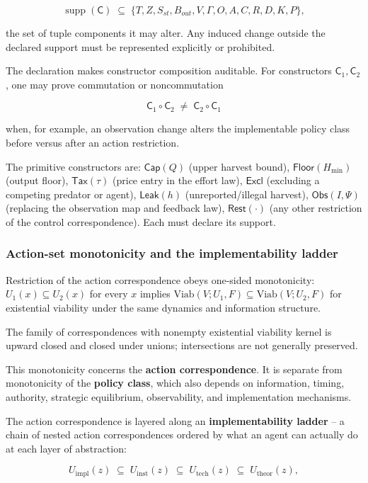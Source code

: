 \documentclass[preprint,11pt,authoryear]{elsarticle}
\theoremstyle{remark}
\begin{document}
\[\operatorname{supp}(\mathsf{C}) \;\subseteq\; \{ T, Z, S_{st}, B_{out}, V, \Gamma, O, A, C, R, D, K, P \},\]

the set of tuple components it may alter. Any induced change outside the declared support must be represented explicitly or prohibited.

The declaration makes constructor composition auditable. For constructors $\mathsf{C}_1, \mathsf{C}_2$, one may prove commutation or noncommutation

\[\mathsf{C}_1 \circ \mathsf{C}_2 \;\neq\; \mathsf{C}_2 \circ \mathsf{C}_1\]

when, for example, an observation change alters the implementable policy class before versus after an action restriction.

The primitive constructors are: $\mathsf{Cap}(Q)$ (upper harvest bound), $\mathsf{Floor}(H_{\min})$ (output floor), $\mathsf{Tax}(\tau)$ (price entry in the effort law), $\mathsf{Excl}$ (excluding a competing predator or agent), $\mathsf{Leak}(h)$ (unreported/illegal harvest), $\mathsf{Obs}(I, \Psi)$ (replacing the observation map and feedback law), $\mathsf{Rest}(\cdot)$ (any other restriction of the control correspondence). Each must declare its support.

\subsubsection{Action-set monotonicity and the implementability ladder}

Restriction of the action correspondence obeys one-sided monotonicity: $U_1(x) \subseteq U_2(x)$ for every $x$ implies $\mathrm{Viab}(V; U_1, F) \subseteq \mathrm{Viab}(V; U_2, F)$ for existential viability under the same dynamics and information structure.

The family of correspondences with nonempty existential viability kernel is upward closed and closed under unions; intersections are not generally preserved.

This monotonicity concerns the \textbf{action correspondence}. It is separate from monotonicity of the \textbf{policy class}, which also depends on information, timing, authority, strategic equilibrium, observability, and implementation mechanisms.

The action correspondence is layered along an \textbf{implementability ladder} -- a chain of nested action correspondences ordered by what an agent can actually do at each layer of abstraction:

\[U_{\mathrm{impl}}(z) \;\subseteq\; U_{\mathrm{inst}}(z) \;\subseteq\; U_{\mathrm{tech}}(z) \;\subseteq\; U_{\mathrm{theor}}(z),\]
\end{document}
